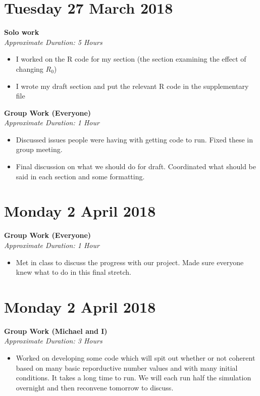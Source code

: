 \documentclass[12pt]{article}\usepackage[]{graphicx}\usepackage[]{color}
\begin{document}
\begin{itemize}
\section*{Tuesday 27 March 2018}
\textbf{Solo work} \\
\emph{Approximate Duration: 5 Hours}

\begin{itemize}
\item I worked on the R code for my section (the section examining the effect of changing $R_0$)
\item I wrote my draft section and put the relevant R code in the supplementary file
\end{itemize}

\textbf{Group Work (Everyone)} \\
\emph{Approximate Duration: 1 Hour}

\begin{itemize}
\item Discussed issues people were having with getting code to run. Fixed these in group meeting.
\item Final discussion on what we should do for draft. Coordinated what should be said in each section and some formatting.
\end{itemize}


\section*{Monday 2 April 2018}
\textbf{Group Work (Everyone)} \\
\emph{Approximate Duration: 1 Hour}

\begin{itemize}
\item Met in class to discuss the progress with our project. Made sure everyone knew what to do in this final stretch.
\end{itemize}

\section*{Monday 2 April 2018}
\textbf{Group Work (Michael and I)} \\
\emph{Approximate Duration: 3 Hours}

\begin{itemize}
\item Worked on developing some code which will spit out whether or not coherent based on many basic reporductive number values and with many initial conditions. It takes a long time to run. We will each run half the simulation overnight and then reconvene tomorrow to discuss.
\end{itemize}


\end{itemize}
\end{document}
